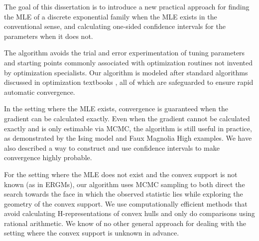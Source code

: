 The goal of this dissertation is to introduce a new practical approach
for finding the MLE of a discrete exponential family when the MLE exists
in the conventional sense,
and calculating one-sided confidence intervals for the parameters when it does not.

The algorithm avoids the trial and error experimentation of tuning parameters 
and starting points commonly associated with optimization routines
not invented by optimization specialists.  Our algorithm is modeled after 
standard algorithms 
discussed in optimization textbooks \citep{Fletcher,NW,Sun:2006},
all of which are safeguarded to ensure rapid automatic convergence.

In the setting where the MLE exists, convergence is guaranteed when the gradient 
can be calculated exactly.  Even when the 
gradient cannot be calculated 
exactly and is only estimable via MCMC, the algorithm is still useful in practice, as 
demonstrated by the Ising model and Faux Magnolia High
examples.  We have also described a way to construct and use confidence intervals to 
make convergence highly probable.

For the setting where the MLE does not exist and the convex support is 
not known (as in ERGMs), our algorithm uses MCMC sampling to
both direct the search towards the face in which the observed statistic lies
while exploring the geometry of the convex support.  We use
computationally efficient methods that avoid calculating H-representations
of convex hulls and only do comparisons using rational arithmetic.
We know of no other general approach for dealing with the setting where
the convex support is unknown in advance.

